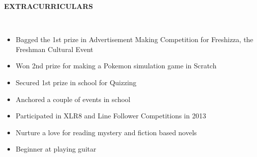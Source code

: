 \documentclass[a4paper,10pt]{article}
\newcommand{\lsep}{-0.5cm}
\newcommand{\resheading}[1]{{\small \colorbox{mygrey}{\begin{minipage}{0.975\textwidth}{\textbf{#1 \vphantom{p\^{E}}}}\end{minipage}}}}
\begin{document}
\resheading{\textbf{EXTRACURRICULARS} }\\[\lsep]
\begin{itemize}
 \itemsep 0em
 \item Bagged the 1st prize in Advertisement Making Competition for Freshizza, the Freshman Cultural Event
 \item Won 2nd prize for making a Pokemon simulation game in Scratch
 \item Secured 1st prize in school for Quizzing
 \item Anchored a couple of events in school
 \item Participated in XLR8 and Line Follower Competitions in 2013
 \item Nurture a love for reading mystery and fiction based novels
 \item Beginner at playing guitar
\end{itemize}
\end{document}
